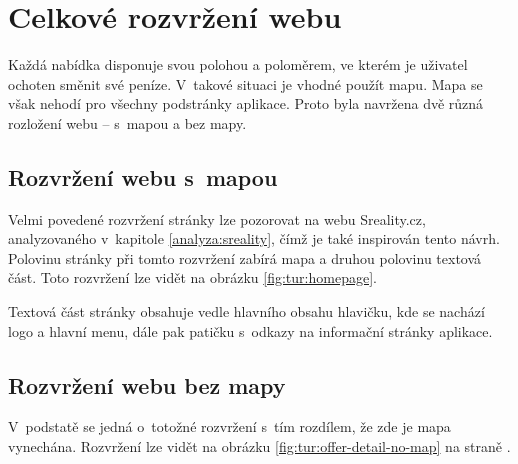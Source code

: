 \section{Celkové rozvržení webu}

\label{nur:layout}

Každá nabídka disponuje svou polohou a poloměrem, ve kterém je uživatel ochoten směnit své peníze. V~takové situaci je vhodné použít mapu. Mapa se však nehodí pro všechny podstránky aplikace. Proto byla navržena dvě různá rozložení webu -- s~mapou a bez mapy.

\subsection{Rozvržení webu s~mapou}
Velmi povedené rozvržení stránky lze pozorovat na webu Sreality.cz, analyzovaného v~kapitole \ref{analyza:sreality}, čímž je také inspirován tento návrh. Polovinu stránky při tomto rozvržení zabírá mapa a druhou polovinu textová část. Toto rozvržení lze vidět na obrázku \ref{fig:tur:homepage}.

Textová část stránky obsahuje vedle hlavního obsahu hlavičku, kde se nachází logo a hlavní menu, dále pak patičku s~odkazy na informační stránky aplikace.

\subsection{Rozvržení webu bez mapy}
V~podstatě se jedná o~totožné rozvržení s~tím rozdílem, že zde je mapa vynechána. Rozvržení lze vidět na obrázku \ref{fig:tur:offer-detail-no-map} na straně \pageref{fig:tur:offer-detail-no-map}.
